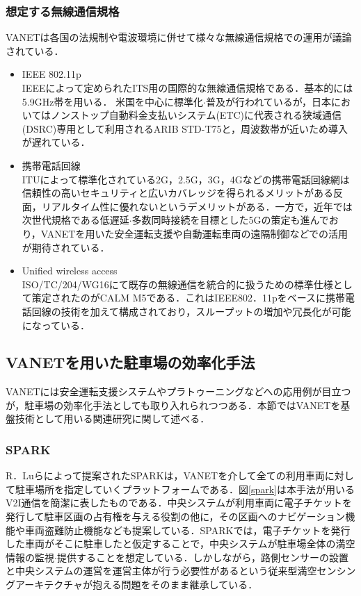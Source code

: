 \subsubsection{想定する無線通信規格}
VANETは各国の法規制や電波環境に併せて様々な無線通信規格での運用が議論されている．

\begin{itemize}
	\item IEEE 802.11p\cite{802.11p-official}\\
	      \label{802.11p}
	      IEEEによって定められたITS用の国際的な無線通信規格である．基本的には5.9GHz帯を用いる．
	      米国を中心に標準化$\cdot$普及が行われているが，日本においてはノンストップ自動料金支払いシステム(ETC)に代表される狭域通信(DSRC)\cite{DSRC}専用として利用されるARIB STD-T75\cite{ARIB}と，周波数帯が近いため導入が遅れている\cite{802.11p-sup}．
	\item 携帯電話回線\\
	      ITUによって標準化されている2G，2.5G，3G，4Gなどの携帯電話回線網\cite{itu}は信頼性の高いセキュリティと広いカバレッジを得られるメリットがある反面，リアルタイム性に優れないというデメリットがある．一方で，近年では次世代規格である低遅延$\cdot$多数同時接続を目標とした5Gの策定も進んでおり，VANETを用いた安全運転支援や自動運転車両の遠隔制御などでの活用が期待されている\cite{5G-soumu}．
	\item Unified wireless access\\
	      ISO/TC/204/WG16\cite{iso-tc-204}にて既存の無線通信を統合的に扱うための標準仕様として策定されたのがCALM M5\cite{CALM}である．これはIEEE802．11pをベースに携帯電話回線の技術を加えて構成されており，スループットの増加や冗長化が可能になっている．
\end{itemize}



\subsection{VANETを用いた駐車場の効率化手法}
\label{sensing-by-vanet}
VANETには安全運転支援システムやプラトゥーニングなどへの応用例が目立つが，駐車場の効率化手法としても取り入れられつつある．本節ではVANETを基盤技術として用いる関連研究に関して述べる．

\subsubsection{SPARK}

R．Luらによって提案されたSPARK\cite{Spark}は，VANETを介して全ての利用車両に対して駐車場所を指定していくプラットフォームである．図\ref{spark}は本手法が用いるV2I通信を簡潔に表したものである．中央システムが利用車両に電子チケットを発行して駐車区画の占有権を与える役割の他に，その区画へのナビゲーション機能や車両盗難防止機能なども提案している．SPARKでは，電子チケットを発行した車両がそこに駐車したと仮定することで，中央システムが駐車場全体の満空情報の監視$\cdot$提供することを想定している．しかしながら，路側センサーの設置と中央システムの運営を運営主体が行う必要性があるという従来型満空センシングアーキテクチャが抱える問題をそのまま継承している．

